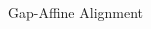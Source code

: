 \documentclass{cbxposter}
\renewcommand{\smallskip}{\vspace{0.16667in}}
\begin{document}
\begin{frame}[fragile,t]{}
\begin{columns}[T]
\begin{column}{10.5in}




\end{column}


\begin{column}{10.5in}
\vspace{0.4in}


\begin{block}{Gap-Affine Alignment}
  \smallskip


\end{block}
\end{column}
\end{columns}
\end{frame}
\end{document}
